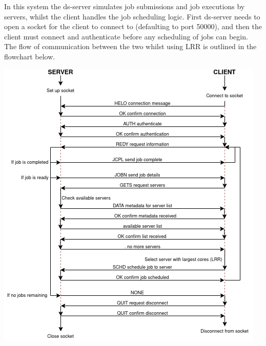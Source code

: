 In this system the ds-server simulates job submissions and job executions by servers, whilst the client handles the job scheduling logic. First ds-server needs to open a socket for the client to connect to (defaulting to port 50000), and then the client must connect and authenticate before any scheduling of jobs can begin.\\
\vspace{.2cm}
The flow of communication between the two whilst using LRR is outlined in the flowchart below.
\begin{center}
    \includegraphics[scale=0.7]{Communication Flowchart.png}
\end{center}

